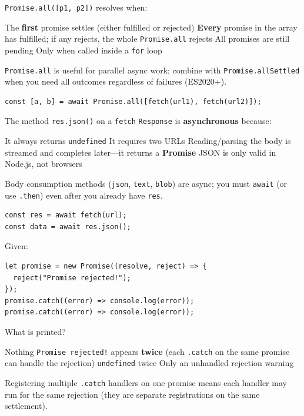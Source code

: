 \newpage

\question[4]
\texttt{Promise.all([p1, p2])} resolves when:
\begin{choices}
  \choice The \textbf{first} promise settles (either fulfilled or rejected)
  \CorrectChoice \textbf{Every} promise in the array has fulfilled; if any rejects, the whole \texttt{Promise.all} rejects
  \choice All promises are still pending
  \choice Only when called inside a \texttt{for} loop
\end{choices}
\begin{solution}
  \texttt{Promise.all} is useful for parallel async work; combine with \texttt{Promise.allSettled} when you need all outcomes regardless of failures (ES2020+).
\begin{lstlisting}[style=jsexam]
const [a, b] = await Promise.all([fetch(url1), fetch(url2)]);
\end{lstlisting}
\end{solution}

\question[4]
The method \texttt{res.json()} on a \texttt{fetch} \texttt{Response} is \textbf{asynchronous} because:
\begin{choices}
  \choice It always returns \texttt{undefined}
  \choice It requires two URLs
  \CorrectChoice Reading/parsing the body is streamed and completes later---it returns a \textbf{Promise}
  \choice JSON is only valid in Node.js, not browsers
\end{choices}
\begin{solution}
  Body consumption methods (\texttt{json}, \texttt{text}, \texttt{blob}) are async; you must \texttt{await} (or use \texttt{.then}) even after you already have \texttt{res}.
\begin{lstlisting}[style=jsexam]
const res = await fetch(url);
const data = await res.json();
\end{lstlisting}
\end{solution}

\question[4]
Given:
\begin{lstlisting}[style=jsexam]
let promise = new Promise((resolve, reject) => {
  reject("Promise rejected!");
});
promise.catch((error) => console.log(error));
promise.catch((error) => console.log(error));
\end{lstlisting}
What is printed?
\begin{choices}
  \choice Nothing
  \CorrectChoice \texttt{Promise rejected!} appears \textbf{twice} (each \texttt{.catch} on the same promise can handle the rejection)
  \choice \texttt{undefined} twice
  \choice Only an unhandled rejection warning
\end{choices}
\begin{solution}
  Registering multiple \texttt{.catch} handlers on one promise means each handler may run for the same rejection (they are separate registrations on the same settlement).
\end{solution}

